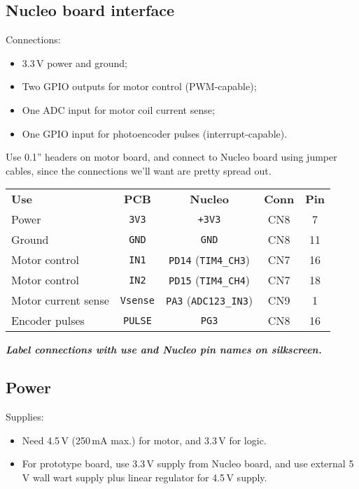 \documentclass[a4paper,11pt,article]{memoir}
\newcommand{\todo}[1]{{\color{red}\textit{\textbf{#1}}}}
\begin{document}
\subsection*{Nucleo board interface}

Connections:
\begin{itemize}
  \item{3.3\,V power and ground;}
  \item{Two GPIO outputs for motor control (PWM-capable);}
  \item{One ADC input for motor coil current sense;}
  \item{One GPIO input for photoencoder pulses (interrupt-capable).}
\end{itemize}

Use 0.1'' headers on motor board, and connect to Nucleo board using
jumper cables, since the connections we'll want are pretty spread out.

\begin{center}
  \begin{tabular}{lcccc}
    \textbf{Use} & \textbf{PCB} & \textbf{Nucleo} & \textbf{Conn} & \textbf{Pin} \\
    Power  & \texttt{3V3} & \texttt{+3V3} & CN8 & 7\\
    Ground & \texttt{GND} & \texttt{GND} & CN8 & 11 \\
    Motor control & \texttt{IN1} & \texttt{PD14} (\texttt{TIM4\_CH3}) & CN7 & 16 \\
    Motor control & \texttt{IN2} & \texttt{PD15} (\texttt{TIM4\_CH4}) & CN7 & 18 \\
    Motor current sense & \texttt{Vsense} & \texttt{PA3} (\texttt{ADC123\_IN3}) & CN9 & 1 \\
    Encoder pulses & \texttt{PULSE} & \texttt{PG3} & CN8 & 16 \\
  \end{tabular}
\end{center}

\todo{Label connections with use and Nucleo pin names on silkscreen.}

\subsection*{Power}

Supplies:
\begin{itemize}
  \item{Need 4.5\,V (250\,mA max.) for motor, and 3.3\,V for logic.}
  \item{For prototype board, use 3.3\,V supply from Nucleo board, and
    use external 5\,V wall wart supply plus linear regulator for
    4.5\,V supply.}
\end{itemize}
\end{document}
